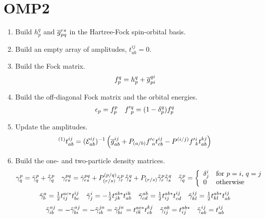 \documentclass[11pt]{article}
\newcommand{\oc}[1]{\ensuremath{\accentset{\circ}{#1}}}
\begin{document}
\section*{OMP2}


\begin{enumerate}
\item
Build $h_p^q$ and $\overline{g}_{pq}^{rs}$ in the Hartree-Fock spin-orbital basis.

\item
Build an empty array of amplitudes, $t_{ab}^{ij}=0$.

\item
\label{item:recursive-step}
Build the Fock matrix.
\begin{align}
  f_p^q
=
  h_p^q
+
  \overline{g}_{pi}^{qi}
\end{align}

\item
Build the off-diagonal Fock matrix and the orbital energies.
\begin{align}
  \epsilon _p
=
  f_p^p
&&
  f'{}_p^q
=
  (1 - \delta _p^q)
  f_p^q
\end{align}

\item
\label{itemocc-step-one}
Update the amplitudes.
\begin{align}
  {}^{(1)}t_{ab}^{ij}
=
  (\mathcal{E}_{ab}^{ij})^{-1}
  \left(
    \overline{g}_{ab}^{ij}
  +
    P_{(a/b)}
    f'{}_a^c
    t_{cb}^{ij}
  -
    P^{(i/j)}
    f'{}_k^i
    t_{ab}^{kj}
  \right)
\end{align}

\item
Build the one- and two-particle density matrices.
\begin{align}
  \g^p_q
=
  \tl{\g}^p_q
+
  \oc{\g}^p_q
&&
  \g^{pq}_{rs}
=
  \tl{\g}^{pq}_{rs}
+
  P^{(p/q)}_{(r/s)}
  \tl{\g}^p_r\,
  \oc{\g}^q_s
+
  P_{(r/s)}
  \oc{\g}^p_r
  \oc{\g}^q_s
&&
  \oc{\g}^p_q
=
\left\{
\begin{array}{ll}
  \d^i_j
&
  \text{for $p=i$, $q=j$}
\\
  0
&
  \text{otherwise}
\end{array}
\right.
\end{align}
\begin{align}
  \tilde{\gamma }^a_b
=
  \tfrac{1}{2}
  t^{ac*}_{ij}
  t_{bc}^{ij}
&&
  \tilde{\gamma }^i_j
=
-
  \tfrac{1}{2}
  t^{ab*}_{jk}
  t_{ab}^{ik}
&&
  \tilde{\gamma }^{ab}_{cd}
=
  \tfrac{1}{2}
  t^{ab*}_{ij}
  t_{cd}^{ij}
&&
  \tilde{\gamma }^{ij}_{kl}
=
  \tfrac{1}{2}
  t^{ab*}_{kl}
  t_{ab}^{ij}
\end{align}
\begin{align}
  \tilde{\gamma }^{aj}_{ib}
=
-
  \tilde{\gamma }^{aj}_{bi}
=
-
  \tilde{\gamma }^{ja}_{ib}
=
  \tilde{\gamma }^{ja}_{bi}
=
  t^{ac*}_{ik}
  t_{cb}^{kj}
&&
  \tilde{\gamma }_{ij}^{ab}
=
  t_{ij}^{ab*}
&&
  \tilde{\gamma }_{ab}^{ij}
=
  t_{ab}^{ij}
\end{align}


\end{enumerate}
\end{document}
